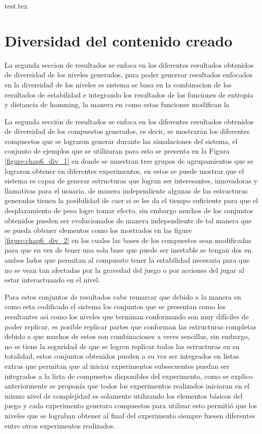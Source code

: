 {test.tex}

\newpage

\section{Diversidad del contenido creado}
\label{section:chap6_diversity_results}

La segunda seccion de resultados se enfoca en los diferentes resultados
obtenidos de diversidad de los niveles generados, para poder generear resultados
enfocados en la diversidad de los niveles es sistema se basa en la combinacion
de los resultados de estabilidad e integrando los resultados de las funciones de
entropia y distancia de hamming, la manera en como estas funciones modifican la 

La segunda sección de resultados se enfoca en los diferentes resultados
obtenidos de diversidad de los compuestos generados, es decir, se mostrarán los
diferentes compuestos que se lograron generar durante las simulaciones del
sistema, el conjunto de ejemplos que se utilizaran para esto se presenta en la
Figura \ref{figure:chap6_div_1} en donde se muestran tres grupos de
agrupamientos que se lograron obtener en diferentes experimentos, en estos se
puede mostrar que el sistema es capaz de generar estructuras que logran ser
interesantes, innovadoras y llamativas para el usuario, de manera independiente
algunas de las estructuras generadas tienen la posibilidad de caer si se les da
el tiempo suficiente para que el desplazamiento de peso logre tomar efecto, sin
embargo muchos de los conjuntos obtenidos pueden ser evolucionados de manera
independiente de tal manera que se pueda obtener elementos como los mostrados en
las figure \ref{figure:chap6_div_2} en los cuales las bases de los compuestos
sean modificadas para que en vez de tener una sola base que puede ser inestable
se tengan dos en ambos lados que permitan al compuesto tener la estabilidad
necesaria para que no se vean tan afectadas por la gravedad del juego o por
acciones del jugar al estar interactuando en el nivel.

Para estos conjuntos de resultados cabe remarcar que debido a la manera en como
esta codificado el sistema los conjuntos que se presentan como los resultantes
así como los niveles que terminan conformando son muy difíciles de poder
replicar, es posible replicar partes que conforman las estructuras completas
debido a que muchos de estos son combinaciones a veces sencillas, sin embargo, no
se tiene la seguridad de que se logren replicar todas las estructuras en su
totalidad, estos conjuntos obtenidos pueden a su vez ser integrados en listas
extras que permitan que al iniciar experimentos subsecuentes puedan ser
integrados a la lista de compuestos disponibles del experimento, como se explico
anteriormente se proponía que todos los experimentos realizados iniciaran en el
mismo nivel de complejidad es solamente utilizando los elementos básicos del
juego y cada experimento generara compuestos para utilizar esto permitió que los
niveles que se lograban obtener al final del experimento siempre fuesen
diferentes entre otros experimentos realizados.

